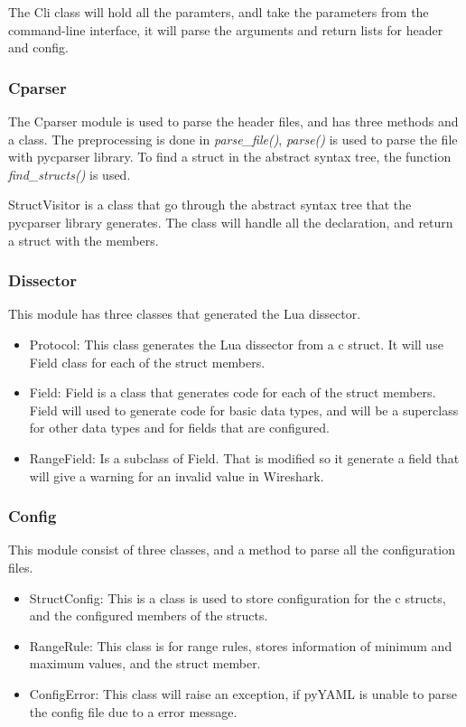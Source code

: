 The Cli class will hold all the paramters, andl take the parameters from the command-line interface, it will parse the arguments and return lists for header and config.

\subsubsection{Cparser}
The Cparser module is used to parse the header files, and has three methods and a class. The preprocessing is done in \emph{parse\_file()}, \emph{parse()} is used to parse the file with pycparser library. To find a struct in the abstract syntax tree, the function \emph{find\_structs()} is used.

StructVisitor is a class that go through the abstract syntax tree that the pycparser library generates. The class will handle all the declaration, and return a struct with the members.

\subsubsection{Dissector}
This module has three classes that generated the Lua dissector.

\begin{itemize}
	\item Protocol: This class generates the Lua dissector from a c struct. It will use Field class for each of the struct members.
	\item Field: Field is a class that generates code for each of the struct members. Field will used to generate code for basic data types, and will be a superclass for other data types and for fields that are configured.
	\item RangeField: Is a subclass of Field. That is modified so it generate a field that will give a warning for an invalid value in Wireshark.
\end{itemize}

\subsubsection{Config}
This module consist of three classes, and a method to parse all the configuration files.
\begin{itemize}
	\item StructConfig: This is a class is used to store configuration for the c structs, and the configured members of the structs.
	\item RangeRule: This class is for range rules, stores information of minimum and maximum values, and the struct member.
	\item ConfigError: This class will raise an exception, if pyYAML is unable to parse the config file due to a error message.
\end{itemize}

